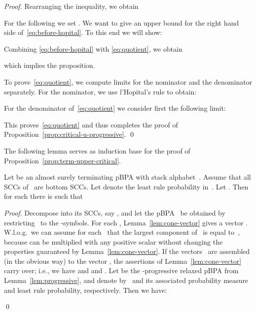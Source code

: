 \begin{proof}
Rearranging the inequality, we obtain

For the following we set .
We want to give an upper bound for the right hand side of~\eqref{eq:before-hopital}.
To this end we will show:
 
Combining \eqref{eq:before-hopital} with \eqref{eq:quotient}, we obtain
 
which implies the proposition.

To prove~\eqref{eq:quotient}, we compute limits for the nominator and the denominator separately.
For the nominator, we use l'Hopital's rule to obtain:
 
For the denominator of~\eqref{eq:quotient} we consider first the following limit:
 
This proves~\eqref{eq:quotient}
 and thus completes the proof of Proposition~\ref{prop:critical-u-progressive}.
\qed
\end{proof}

The following lemma serves as induction base for the proof of Proposition~\ref{prop:term-upper-critical}.
\begin{lemma} \label{lem:critical-strongly-connected}
  Let  be an almost surely terminating pBPA with stack alphabet~.
  Assume that all SCCs of~ are bottom SCCs.
  Let  denote the least rule probability in~.
  Let .
Then for each  there is  such that
   
\end{lemma}
\begin{proof}
Decompose  into its SCCs, say ,
 and let the pBPA~ be obtained by restricting~ to the -symbols.
For each , Lemma~\ref{lem:cone-vector} gives a vector .
W.l.o.g.\ we can assume for each~ that the largest component of~ is equal to~,
 because  can be multiplied with any positive scalar without changing the properties guaranteed by Lemma~\ref{lem:cone-vector}.
If the vectors~ are assembled (in the obvious way) to the vector ,
 the assertions of Lemma~\ref{lem:cone-vector} carry over;
 i.e., we have  and  and .
Let  be the -progressive relaxed pBPA from Lemma~\ref{lem:progressive},
 and denote by~ and  its associated probability measure and least rule probability, respectively.
Then we have:

\qed
\end{proof}

